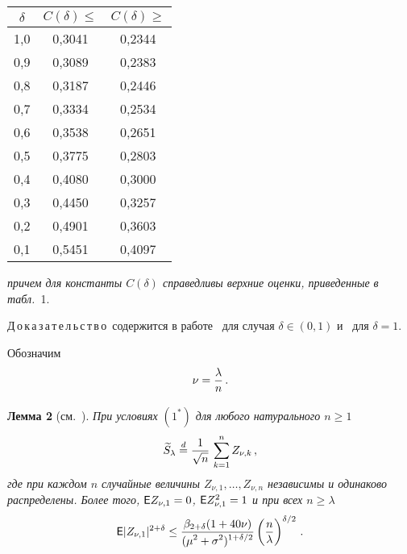 \begin{multicols}{2}
\begin{center}
{\small 
\tabcolsep=12pt
\begin{tabular}{|c|c|c|}
  \hline 
  $\delta$ & $C(\delta)\le$ & $C(\delta)\ge$ \\
\hline
1{,}0 & 0{,}3041 & 0{,}2344\\
0{,}9 & 0{,}3089 & 0{,}2383\\
0{,}8 & 0{,}3187 & 0{,}2446\\
0{,}7 & 0{,}3334 & 0{,}2534\\
0{,}6 & 0{,}3538 & 0{,}2651\\
0{,}5 & 0{,}3775 & 0{,}2803\\
0{,}4 & 0{,}4080 & 0{,}3000\\
0{,}3 & 0{,}4450 & 0{,}3257\\
0{,}2 & 0{,}4901 & 0{,}3603\\
0{,}1 & 0{,}5451 & 0{,}4097\\
\hline
\end{tabular}
}
\end{center}
\vspace*{9pt}

\bigskip
\addtocounter{table}{1}

\noindent
\textit{причем для константы $C(\delta)$ справедливы верхние оценки,
приведенные в табл.}~1.



  \medskip

\noindent
Д\,о\,к\,а\,з\,а\,т\,е\,л\,ь\,с\,т\,в\,о\ содержится в работе~\cite{GS2010} для случая 
$\delta\in(0,1)$ и~\cite{KSOPPM2010,KSSAJ2010} для $\delta=1$.

  \medskip

  Обозначим $$\nu = \displaystyle\frac{\displaystyle \lambda\mathstrut}{\displaystyle n\mathstrut}\,.$$

  \medskip

\noindent
\textbf{Лемма 2} (см.~\cite{KBS2007, S2007}). \textit{При условиях
$(1^\ast)$ для любого натурального $n\ge1$}
$$
\widetilde{S}_\lambda \stackrel{d}{=}
\displaystyle\frac{\displaystyle 1\mathstrut}{\displaystyle \sqrt{n}\mathstrut}\,\sum_{k=1}^n Z_{\nu,k}\,,
$$
\textit{где при каждом $n$ случайные величины $Z_{\nu,1},\ldots,
Z_{\nu,n}$ независимы и одинаково распределены. Более того, ${\sf E}
Z_{\nu,1}=0$, ${\sf E} Z_{\nu,1}^2=1$ и при всех $n\ge\lambda$}
\begin{equation}
{{\sf E}}|Z_{\nu,1}|^{2+\delta}\le
\displaystyle\frac{\displaystyle \beta_{2+\delta}(1+40\nu)\mathstrut}{\displaystyle (\mu^2+\sigma^2)^{1+\delta/2}\mathstrut}
\left(\displaystyle\frac{\displaystyle n\mathstrut}{\displaystyle \lambda\mathstrut}\right)^{\delta/2}\,. 
\label{e4-shev}
\end{equation}


\end{multicols}
